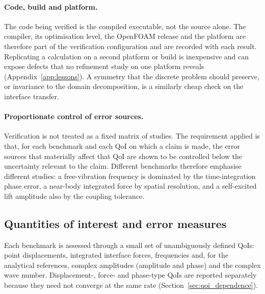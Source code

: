 \paragraph{Code, build and platform.}
The code being verified is the compiled executable, not the source alone.
The compiler, its optimisation level, the OpenFOAM release and the platform are therefore part of the verification configuration and are recorded with each result.
Replicating a calculation on a second platform or build is inexpensive and can expose defects that no refinement study on one platform reveals (Appendix~\ref{app:lessons}).
A symmetry that the discrete problem should preserve, or invariance to the domain decomposition, is a similarly cheap check on the interface transfer.

\paragraph{Proportionate control of error sources.}
Verification is not treated as a fixed matrix of studies.
The requirement applied is that, for each benchmark and each QoI on which a claim is made, the error sources that materially affect that QoI are shown to be controlled below the uncertainty relevant to the claim.
Different benchmarks therefore emphasise different studies: a free-vibration frequency is dominated by the time-integration phase error, a near-body integrated force by spatial resolution, and a self-excited lift amplitude also by the coupling tolerance.

\subsection{Quantities of interest and error measures}\label{sec:qoi}

Each benchmark is assessed through a small set of unambiguously defined QoIs: point displacements, integrated interface forces, frequencies and, for the analytical references, complex amplitudes (amplitude and phase) and the complex wave number.
Displacement-, force- and phase-type QoIs are reported separately because they need not converge at the same rate (Section~\ref{sec:qoi_dependence}).

